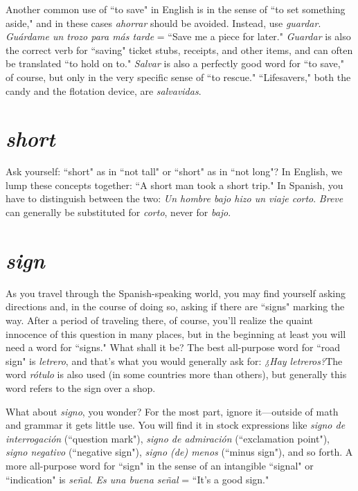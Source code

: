 Another common use of ``to save" in English is in the sense of
``to set something aside," and in these cases \emph{ahorrar} should be avoided.
Instead, use \emph{guardar}. \emph{Guárdame un trozo para más tarde} = ``Save me
a piece for later." \emph{Guardar} is also the correct verb for ``saving" ticket
stubs, receipts, and other items, and can often be translated ``to hold
on to." \emph{Salvar} is also a perfectly good word for ``to save," of course, but
only in the very specific sense of ``to rescue." ``Lifesavers," both the
candy and the flotation device, are \emph{salvavidas}.

\section{\emph{short}}

Ask yourself: ``short" as in ``not tall" or ``short" as in ``not
long"? In English, we lump these concepts together: ``A short man
took a short trip." In Spanish, you have to distinguish between the
two: \emph{Un hombre bajo hizo un viaje corto}. \emph{Breve} can generally be substituted for \emph{corto}, never for \emph{bajo}.

\section{\emph{sign}}

As you travel through the Spanish-speaking world, you may
find yourself asking directions and, in the course of doing so, asking if
there are ``signs" marking the way. After a period of traveling there, of
course, you'll realize the quaint innocence of this question in many
places, but in the beginning at least you will need a word for ``signs."
What shall it be? The best all-purpose word for ``road sign" is \emph{letrero},
and that's what you would generally ask for: \emph{¿Hay letreros?}The word
\emph{rótulo} is also used (in some countries more than others), but generally
this word refers to the sign over a shop.

What about \emph{signo}, you wonder? For the most part, ignore it---outside of math and grammar it gets little use. You will find it in stock
expressions like \emph{signo de interrogación} (``question mark"), \emph{signo de
	admiración} (``exclamation point"), \emph{signo negativo} (``negative sign"),
\emph{signo (de) menos} (``minus sign"), and so forth. A more all-purpose word
for ``sign" in the sense of an intangible ``signal" or ``indication" is \emph{señal}.
\emph{Es una buena señal} = ``It's a good sign."

